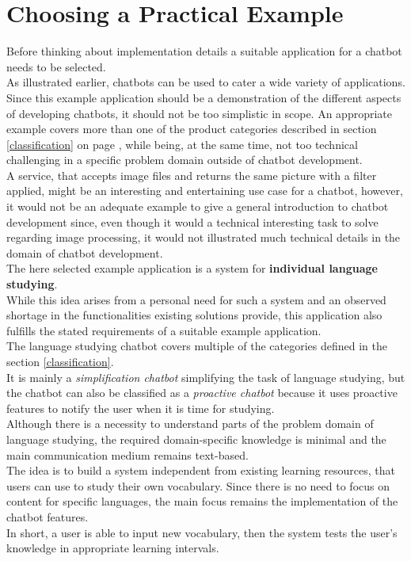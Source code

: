 \section{Choosing a Practical Example}


Before thinking about implementation details a suitable application for a chatbot needs to be selected.
\\
As illustrated earlier, chatbots can be used to cater a wide variety of applications.
\\

Since this example application should be a demonstration of the different aspects of developing chatbots,
it should not be too simplistic in scope.
An appropriate example covers more than one of the product categories described in section \ref{classification} on page \pageref{classification},
while being, at the same time, not too technical challenging in a specific  problem domain outside of chatbot development.
\\
A service, that accepts image files and returns the same picture with a filter applied, might be an interesting and entertaining use case for a chatbot, however, it would not be an adequate example to give a general introduction to chatbot development since, even though it would a technical interesting task to solve regarding image processing, it would not illustrated much technical details in the domain of chatbot development.
\\

The here selected example application is a system for \textbf{individual language studying}.
\\
While this idea arises from a personal need for such a system and an observed shortage in the functionalities existing solutions provide,
this application also fulfills the stated requirements of a suitable example application.
\\

The language studying chatbot covers multiple of the categories defined in the section \ref{classification}.
\\
It is mainly a \emph{simplification chatbot} simplifying the task of language studying,
but the chatbot can also be classified as a \emph{proactive chatbot} because it uses proactive features to notify the user when it is time for studying.
\\

Although there is a necessity to understand parts of the problem domain of language studying,
the required domain-specific knowledge is minimal and the main communication medium remains text-based.
\\

The idea is to build a system independent from existing learning resources, that users can use to study their own vocabulary.
Since there is no need to focus on content for specific languages, the main focus remains the implementation of the chatbot features.
\\

In short, a user is able to input new vocabulary, then the system tests the user's knowledge in appropriate learning intervals.
